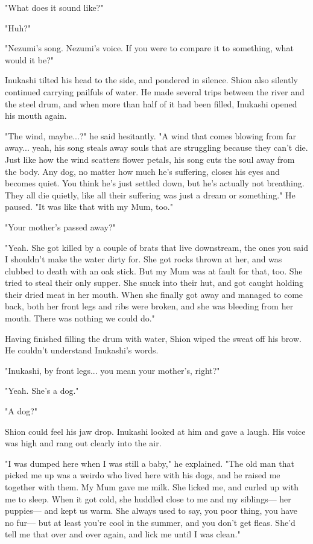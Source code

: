 "What does it sound like?"

"Huh?"

"Nezumi's song. Nezumi's voice. If you were to compare it to something,
what would it be?"

Inukashi tilted his head to the side, and pondered in silence. Shion
also silently continued carrying pailfuls of water. He made several
trips between the river and the steel drum, and when more than half of
it had been filled, Inukashi opened his mouth again.

"The wind, maybe...?" he said hesitantly. "A wind that comes blowing
from far away... yeah, his song steals away souls that are struggling
because they can't die. Just like how the wind scatters flower petals,
his song cuts the soul away from the body. Any dog, no matter how much
he's suffering, closes his eyes and becomes quiet. You think he's just
settled down, but he's actually not breathing. They all die quietly,
like all their suffering was just a dream or something." He paused. "It
was like that with my Mum, too."

"Your mother's passed away?"

"Yeah. She got killed by a couple of brats that live downstream, the
ones you said I shouldn't make the water dirty for. She got rocks thrown
at her, and was clubbed to death with an oak stick. But my Mum was at
fault for that, too. She tried to steal their only supper. She snuck
into their hut, and got caught holding their dried meat in her mouth.
When she finally got away and managed to come back, both her front legs
and ribs were broken, and she was bleeding from her mouth. There was
nothing we could do."

Having finished filling the drum with water, Shion wiped the sweat off
his brow. He couldn't understand Inukashi's words.

"Inukashi, by front legs... you mean your mother's, right?"

"Yeah. She's a dog."

"A dog?"

Shion could feel his jaw drop. Inukashi looked at him and gave a laugh.
His voice was high and rang out clearly into the air.

"I was dumped here when I was still a baby," he explained. "The old man
that picked me up was a weirdo who lived here with his dogs, and he
raised me together with them. My Mum gave me milk. She licked me, and
curled up with me to sleep. When it got cold, she huddled close to me
and my siblings--- her puppies--- and kept us warm. She always used to say,
you poor thing, you have no fur--- but at least you're cool in the summer,
and you don't get fleas. She'd tell me that over and over again, and
lick me until I was clean."

